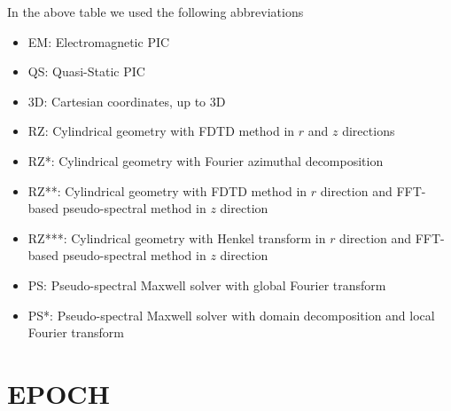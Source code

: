 \documentclass[12pt, class=report, crop=false]{standalone}
\begin{document}
In the above table we used the following abbreviations
\begin{itemize}
    \item EM: Electromagnetic PIC
    \item QS: Quasi-Static PIC
    \item 3D: Cartesian coordinates, up to 3D
    \item RZ: Cylindrical geometry with FDTD method in \(r\) and \(z\) directions
    \item RZ*: Cylindrical geometry with Fourier azimuthal decomposition
    \item RZ**: Cylindrical geometry with FDTD method in \(r\) direction
                and FFT-based pseudo-spectral method in \(z\) direction
    \item RZ***: Cylindrical geometry with Henkel transform in \(r\) direction
                and FFT-based pseudo-spectral method in \(z\) direction
    \item PS: Pseudo-spectral Maxwell solver with global Fourier transform
    \item PS*: Pseudo-spectral Maxwell solver with domain decomposition and local Fourier transform
\end{itemize}


\section{EPOCH}
\end{document}

